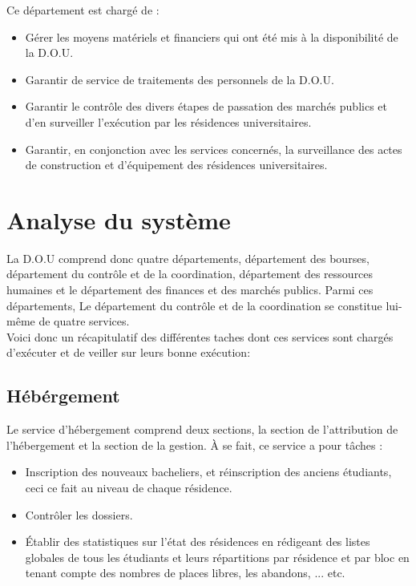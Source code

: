         Ce département est chargé de :
        \begin{itemize}\renewcommand{\labelitemi}{$\bullet$}
            \item Gérer les moyens matériels et financiers qui ont été mis à la disponibilité de la \acs{D.O.U}.
            \item Garantir de service de traitements des personnels de la \acs{D.O.U}.
            \item Garantir le contrôle des divers étapes de passation des marchés publics et d'en surveiller l'exécution par les résidences universitaires.
            \item Garantir, en conjonction avec les services concernés, la surveillance des actes de construction et d'équipement des résidences universitaires.\\
        \end{itemize}

\section{Analyse du système}
    La \acs{D.O.U} comprend donc quatre départements, département des bourses, département du contrôle et de la coordination, département des ressources humaines et le département des finances et des marchés publics.
    Parmi ces départements, Le département du contrôle et de la coordination se constitue lui-même de quatre services.\\

    Voici donc un récapitulatif des différentes taches dont ces services sont chargés d'exécuter et de veiller sur leurs bonne exécution:

    \subsection*{Hébérgement}
    Le service d'hébergement comprend deux sections, la section de l'attribution de l'hébergement et la section de la gestion. À se fait, ce service a pour tâches :

    \begin{itemize}
        \item Inscription des nouveaux bacheliers, et réinscription des anciens étudiants, ceci ce fait au niveau de chaque résidence.
        \item Contrôler les dossiers.
        \item Établir des statistiques sur l'état des résidences en rédigeant des listes globales de tous les étudiants et leurs répartitions par résidence et par bloc en tenant compte des nombres de places libres, les abandons, ... etc.
    \end{itemize}

